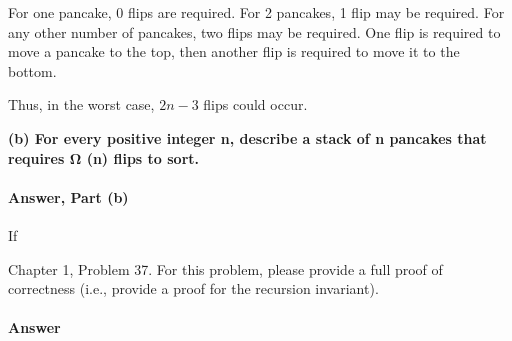 \documentclass{article}
\begin{document}
For one pancake, 0 flips are required. For 2 pancakes, 1 flip may be required. For any other number of pancakes,
two flips may be required. One flip is required to move a pancake to the top, then another flip is required to
move it to the bottom.

Thus, in the worst case, $2n - 3$ flips could occur.

{\bf (b) For every positive integer n, describe a stack of n pancakes that requires
Ω (n) flips to sort.}

\paragraph{Answer, Part (b)}

If

\todo{}

\collab{\todo{}}

Chapter 1, Problem 37.  For this problem, please provide a full proof of
correctness (i.e., provide a proof for the recursion invariant).

\paragraph{Answer}
\todo{}
\end{document}
